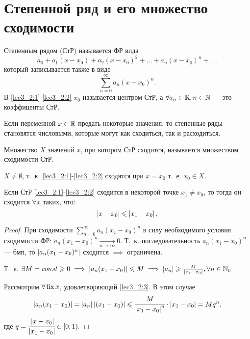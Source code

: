 \documentclass[../../main.tex]{subfiles}
\begin{document}
\section{Степенной ряд и его множество сходимости}

Степенным рядом (СтР) называется ФР вида
\begin{equation}\label{lec3_2:1}
a_0+a_1(x-x_0)+a_2(x-x_0)^2+\dots+a_n(x-x_0)^n+\dots.
\end{equation}
который записывается также в виде
\begin{equation}\label{lec3_2:2}
\sum_{n=0}^{\infty}a_n(x-x_0)^n.
\end{equation}
В \ref{lec3_2:1}-\ref{lec3_2:2} $x_0$ называется центром СтР, 
а $\forall a_n \in \mathbb{R}, n\in \mathbb{N}$ --- это коэффиценты СтР.

Если переменной $x\in\mathbb{R}$ предать некоторые значения, 
то степенные ряды становятся числовыми, которые могут как сходиться, 
так и расходиться.

Множество $X$ значений $x$, при котором СтР сходится, 
называется множеством сходимости СтР. 

$X \neq \emptyset$, т.~к. \ref{lec3_2:1}-\ref{lec3_2:2} 
сходятся при $x=x_0$ т.~е. $x_0\in X$.

\begin{lem}
	Если СтР \ref{lec3_2:1}-\ref{lec3_2:2} сходится в некоторой 
	точке $x_1\neq x_0$, то тогда он сходится $\forall x$ таких, что:
	\begin{equation}\label{lec3_2:3}
		 \left|{ x - x_0}\right| \leqslant \left|{x_1 - x_0}\right|.
	\end{equation}
\end{lem}
\begin{proof}
	При сходимости $\sum_{n=0}^{\infty}a_n(x_1-x_0)^n$ в силу необходимого
	 условия сходимости ФР: $a_n(x_1-x_0)^n\underset{n\to\infty}{\rightarrow}0$. 
	Т.~к. последовательность $a_n(x_1-x_0)^n$ --- бмп, 
	то $\left|{a_n(x_1-x_0)^n}\right|$ сходится $\implies$ ограничена.
	
	Т.~е. $\exists M=const \geqslant0 \implies \left|{a_n(x_1-x_0)}\right| \leqslant M
	\implies \left|{a_n}\right|\geqslant \frac{M}{\left|{x_1-x_0}\right|}, \forall n\in\mathbb{N}_0$
	
	Рассмотрим $\forall \operatorname{fix} x $, удовлетворяющий \ref{lec3_2:3}. 
	В этом случае  
	\begin{equation*}
		\left|{a_n(x_1-x_0)}\right| = \left|{a_n}\right|\left|{(x_1-x_0)}\right|\leqslant 
		\cfrac{M}{\left|{x_1-x_0}\right|^n}\cdot \left|{x_1-x_0}\right|=Mq^n,
	\end{equation*}
	где $q=\cfrac{\left|{x-x_0}\right|}{\left|{x_1-x_0}\right|}\in{\left[0;1\right)}.$
\end{proof}	
\end{document}
